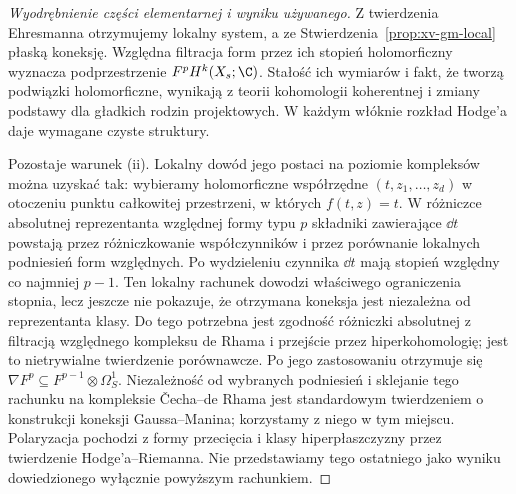 \begin{proof}[Wyodrębnienie części elementarnej i wyniku używanego]
Z twierdzenia Ehresmanna otrzymujemy lokalny system,
a ze Stwierdzenia~\ref{prop:xv-gm-local} płaską koneksję.
Względna filtracja form przez ich stopień holomorficzny
wyznacza podprzestrzenie $F^pH^k(X_s;\C)$.
Stałość ich wymiarów i fakt, że tworzą podwiązki holomorficzne,
wynikają z teorii kohomologii koherentnej i zmiany podstawy
dla gładkich rodzin projektowych. W każdym włóknie
rozkład Hodge'a daje wymagane czyste struktury.

Pozostaje warunek (ii). Lokalny dowód jego postaci
na poziomie kompleksów można uzyskać tak:
wybieramy holomorficzne współrzędne $(t,z_1,\dots,z_d)$
w otoczeniu punktu całkowitej przestrzeni, w których
$f(t,z)=t$. W różniczce absolutnej reprezentanta
względnej formy typu $p$ składniki zawierające $\dd t$
powstają przez różniczkowanie współczynników i przez
porównanie lokalnych podniesień form względnych.
Po wydzieleniu czynnika $\dd t$ mają stopień
względny co najmniej $p-1$. Ten lokalny rachunek dowodzi
właściwego ograniczenia stopnia, lecz jeszcze nie pokazuje,
że otrzymana koneksja jest niezależna od reprezentanta klasy.
Do tego potrzebna jest zgodność różniczki absolutnej
z filtracją względnego kompleksu de Rhama i przejście
przez hiperkohomologię; jest to nietrywialne twierdzenie
porównawcze. Po jego zastosowaniu otrzymuje się
$\nabla F^p\subseteq F^{p-1}\otimes\Omega_S^1$.
Niezależność od wybranych podniesień i sklejanie
tego rachunku na kompleksie \v{C}echa--de Rhama
jest standardowym twierdzeniem o konstrukcji koneksji
Gaussa--Manina; korzystamy z niego w tym miejscu.
Polaryzacja pochodzi z formy przecięcia i klasy
hiperpłaszczyzny przez twierdzenie Hodge'a--Riemanna.
Nie przedstawiamy tego ostatniego jako wyniku
dowiedzionego wyłącznie powyższym rachunkiem.
\end{proof}

